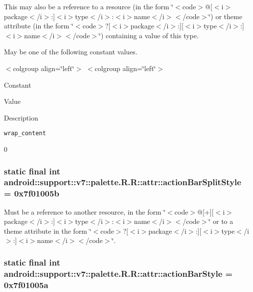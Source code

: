 This may also be a reference to a resource (in the form \char`\"{}$<$code$>$@\mbox{[}$<$i$>$package$<$/i$>$:\mbox{]}$<$i$>$type$<$/i$>$:$<$i$>$name$<$/i$>$$<$/code$>$\char`\"{}) or theme attribute (in the form \char`\"{}$<$code$>$?\mbox{[}$<$i$>$package$<$/i$>$:\mbox{]}\mbox{[}$<$i$>$type$<$/i$>$:\mbox{]}$<$i$>$name$<$/i$>$$<$/code$>$\char`\"{}) containing a value of this type. 

May be one of the following constant values. \begin{TabularC}{0}
\hline
\end{TabularC}
$<$colgroup align=\char`\"{}left\char`\"{}$>$ $<$colgroup align=\char`\"{}left\char`\"{}$>$ 

Constant

Value

Description 

{\tt wrap\_\-content}

0\hypertarget{classandroid_1_1support_1_1v7_1_1palette_1_1_r_1_1attr_1f02c5216f70e8b76166320a40fc84b8}{
\subsubsection[{actionBarSplitStyle}]{\setlength{\rightskip}{0pt plus 5cm}static final int android::support::v7::palette.R.R::attr::actionBarSplitStyle = 0x7f01005b}}
\label{classandroid_1_1support_1_1v7_1_1palette_1_1_r_1_1attr_1f02c5216f70e8b76166320a40fc84b8}


Must be a reference to another resource, in the form \char`\"{}$<$code$>$@\mbox{[}+\mbox{]}\mbox{[}$<$i$>$package$<$/i$>$:\mbox{]}$<$i$>$type$<$/i$>$:$<$i$>$name$<$/i$>$$<$/code$>$\char`\"{} or to a theme attribute in the form \char`\"{}$<$code$>$?\mbox{[}$<$i$>$package$<$/i$>$:\mbox{]}\mbox{[}$<$i$>$type$<$/i$>$:\mbox{]}$<$i$>$name$<$/i$>$$<$/code$>$\char`\"{}. \hypertarget{classandroid_1_1support_1_1v7_1_1palette_1_1_r_1_1attr_4bf9bd8d5305bde80254d2736feed0c7}{
\subsubsection[{actionBarStyle}]{\setlength{\rightskip}{0pt plus 5cm}static final int android::support::v7::palette.R.R::attr::actionBarStyle = 0x7f01005a}}
\label{classandroid_1_1support_1_1v7_1_1palette_1_1_r_1_1attr_4bf9bd8d5305bde80254d2736feed0c7}


